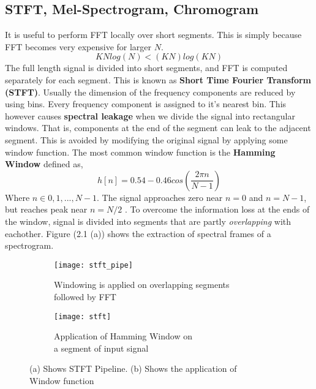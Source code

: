 \subsection{STFT, Mel-Spectrogram, Chromogram}
\label{stft}
It is useful to perform FFT locally over short segments. This is simply because FFT becomes very expensive for larger $N$. 
\[
KNlog(N) < (KN)log(KN)
\]
The full length signal is divided into short segments, and FFT is computed separately for each segment. This is known as \textbf{Short Time Fourier Transform (STFT)}. Usually the dimension of the frequency components are reduced by using bins. Every frequency component is assigned to it's nearest bin. This however causes \textbf{spectral leakage} when we divide the signal into rectangular windows. That is, components at the end of the segment can leak to the adjacent segment. This is avoided by modifying the original signal by applying some window function. The most common window function is the \textbf{Hamming Window} defined as,
\begin{equation}
h[n] = 0.54 - 0.46cos(\frac{2 \pi n}{N-1})
\end{equation}
Where $n \in {0,1,...,N-1}$. The signal approaches zero near $n=0$ and $n=N-1$, but reaches peak near $n=N/2$ \cite{specLeak}. To overcome the information loss at the ends of the window, signal is divided into segments that are partly \textit{overlapping} with eachother. Figure (2.1 (a)) shows the extraction of spectral frames of a spectrogram.  
\begin{figure}[h]
       \begin{subfigure}[b]{0.6\textwidth}
        \texttt{[image: stft\_pipe]}
        \caption{Windowing is applied on overlapping segments\\ followed by FFT }
        \label{fig:STFT Pipe}
       \end{subfigure}
	    \begin{subfigure}[b]{0.4\textwidth}
        \texttt{[image: stft]}
        \caption{
        Application of Hamming Window on \\a segment of input signal
        }
        \label{fig:Hamming Window}
       \end{subfigure}
       \caption{(a) Shows STFT Pipeline. (b) Shows the application of \\Window function}\label{fig:STFT}
\end{figure}
\bigskip

